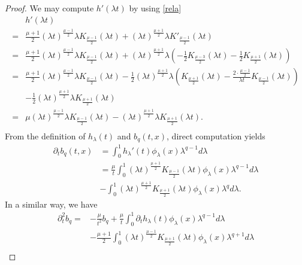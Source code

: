 \documentclass[review]{elsarticle}
\newtheorem{proof}{Proof}[section]
\begin{document}
\begin{proof}
We may compute $h'(\lambda t)$ by using \eqref{rela}
\begin{equation}\label{dh}
\begin{aligned}
&h'(\lambda t)\\
=&\frac{\mu+1}{2}(\lambda t)^{\frac{\mu-1}{2}}\lambda K_{\frac{\mu-1}{2}}(\lambda t)
+(\lambda t)^{\frac{\mu+1}{2}}\lambda K'_{\frac{\mu-1}{2}}(\lambda t)\\
=&\frac{\mu+1}{2}(\lambda t)^{\frac{\mu-1}{2}}\lambda K_{\frac{\mu-1}{2}}(\lambda t)+(\lambda t)^{\frac{\mu+1}{2}}\lambda
\left(-\frac12K_{\frac{\mu-3}{2}}(\lambda t)-\frac12K_{\frac{\mu+1}{2}}(\lambda t)\right)\\
=&\frac{\mu+1}{2}(\lambda t)^{\frac{\mu-1}{2}}\lambda K_{\frac{\mu-1}{2}}(\lambda t)-\frac12(\lambda t)^{\frac{\mu+1}{2}}\lambda
\left(K_{\frac{\mu+1}{2}}(\lambda t)-\frac{2\cdot\frac{\mu-1}{2}}{\lambda t}
K_{\frac{\mu-1}{2}}(\lambda t)\right)\\
&-\frac12(\lambda t)^{\frac{\mu+1}{2}}\lambda K_{\frac{\mu+1}{2}}(\lambda t)\\
=&\mu (\lambda t)^{\frac{\mu-1}{2}}\lambda K_{\frac{\mu-1}{2}}(\lambda t)-(\lambda t)^{\frac{\mu+1}{2}}\lambda K_{\frac{\mu+1}{2}}(\lambda t).\\
\end{aligned}
\end{equation}
From the definition of $h_\lambda(t)$ and $b_q(t, x)$, direct computation yields
\begin{equation}\label{l41}
\begin{aligned}
\partial_tb_q(t,x)&=\int_{0}^{1}h_\lambda'(t)\phi_\lambda(x)\lambda^{q-1}d\lambda\\
&=\frac{\mu}{t}\int_{0}^{1}(\lambda t)^{\frac{\mu+1}{2}}K_{\frac{\mu-1}{2}}(\lambda t)\phi_\lambda(x)\lambda^{q-1}d\lambda\\
&-\int_{0}^{1}(\lambda t)^{\frac{\mu+1}{2}}K_{\frac{\mu+1}{2}}(\lambda t)\phi_\lambda(x)\lambda^{q}d\lambda.
\end{aligned}
\end{equation}
In a similar way, we have
\begin{equation}\label{l42}
\begin{aligned}
\partial_t^2b_q=&-\frac{\mu}{t^2}b_q+\frac{\mu}t\int_0^1\partial_th_\lambda(t)
\phi_\lambda(x)\lambda^{q-1}d\lambda\\
&-\frac{\mu+1}{2}\int_0^1(\lambda t)^{\frac{\mu-1}{2}}K_{\frac{\mu+1}{2}}(\lambda t)\phi_\lambda(x)\lambda^{q+1}d\lambda\\

\end{aligned}
\end{equation}
\end{proof}
\end{document}
